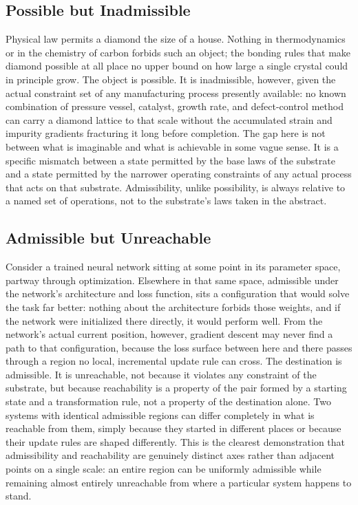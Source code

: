 \documentclass[11pt]{book}
\begin{document}
\subsection{Possible but Inadmissible}

Physical law permits a diamond the size of a house. Nothing in thermodynamics or in the chemistry of carbon forbids such an object; the bonding rules that make diamond possible at all place no upper bound on how large a single crystal could in principle grow. The object is possible. It is inadmissible, however, given the actual constraint set of any manufacturing process presently available: no known combination of pressure vessel, catalyst, growth rate, and defect-control method can carry a diamond lattice to that scale without the accumulated strain and impurity gradients fracturing it long before completion. The gap here is not between what is imaginable and what is achievable in some vague sense. It is a specific mismatch between a state permitted by the base laws of the substrate and a state permitted by the narrower operating constraints of any actual process that acts on that substrate. Admissibility, unlike possibility, is always relative to a named set of operations, not to the substrate's laws taken in the abstract.

\subsection{Admissible but Unreachable}

Consider a trained neural network sitting at some point in its parameter space, partway through optimization. Elsewhere in that same space, admissible under the network's architecture and loss function, sits a configuration that would solve the task far better: nothing about the architecture forbids those weights, and if the network were initialized there directly, it would perform well. From the network's actual current position, however, gradient descent may never find a path to that configuration, because the loss surface between here and there passes through a region no local, incremental update rule can cross. The destination is admissible. It is unreachable, not because it violates any constraint of the substrate, but because reachability is a property of the pair formed by a starting state and a transformation rule, not a property of the destination alone. Two systems with identical admissible regions can differ completely in what is reachable from them, simply because they started in different places or because their update rules are shaped differently. This is the clearest demonstration that admissibility and reachability are genuinely distinct axes rather than adjacent points on a single scale: an entire region can be uniformly admissible while remaining almost entirely unreachable from where a particular system happens to stand.
\end{document}
